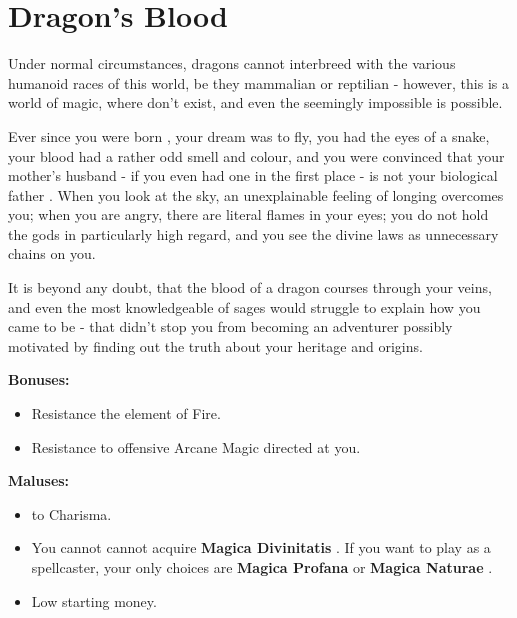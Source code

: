\section{Dragon's Blood}
Under normal circumstances, dragons cannot interbreed with the various humanoid races of this world, be they mammalian  or reptilian  - however, this is a world of magic, where  don't exist, and even the seemingly impossible is possible.

Ever since you were born , your dream was to fly, you had the eyes of a snake, your blood had a rather odd smell and colour, and you were convinced that your mother's husband - if you even had one in the first place - is not your biological father . When you look at the sky, an unexplainable feeling of longing overcomes you; when you are angry, there are literal flames in your eyes; you do not hold the gods  in particularly high regard, and you see the divine laws as unnecessary chains on you.

It is beyond any doubt, that the blood of a dragon courses through your veins, and even the most knowledgeable of sages would struggle to explain how you came to be - that didn't stop you from becoming an adventurer possibly motivated by finding out the truth about your heritage and origins.

\textbf{Bonuses:}
\begin{itemize}
	\item Resistance the element of Fire.
	\item Resistance to offensive Arcane Magic directed at you.
\end{itemize}

\textbf{Maluses:}
\begin{itemize}
	\item {} to Charisma.
	\item You cannot cannot acquire \textbf{Magica Divinitatis} . If you want to play as a spellcaster, your only choices are \textbf{Magica Profana}  or \textbf{Magica Naturae} .
	\item Low starting money.
\end{itemize}
